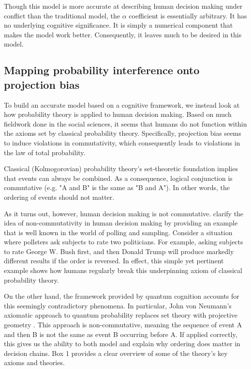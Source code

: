 \documentclass[12pt]{article}
\begin{document}
	Though this model is more accurate at describing human decision making under conflict than the traditional model, the $\alpha$ coefficient is essentially arbitrary. It has no underlying cognitive significance. It is simply a numerical component that makes the model work better. Consequently, it leaves much to be desired in this model. 
	
		\subsection{Mapping probability interference onto projection bias}
	To build an accurate model based on a cognitive framework, we instead look at how probability theory is applied to human decision making. Based on much fieldwork done in the social sciences, it seems that humans do not function within the axioms set by classical probability theory. Specifically, projection bias seems to induce violations in commutativity, which consequently leads to violations in the law of total probability. 
	
	Classical (Kolmogorovian) probability theory's set-theoretic foundation implies that events can always be combined. As a consequence, logical conjunction is commutative (e.g. "A and B" is the same as "B and A"). In other words, the ordering of events should not matter. 
	
	As it turns out, however, human decision making is not commutative. \cite{bruza_wang_busemeyer_2015} clarify the idea of non-commutativity in human decision making by providing an example that is well known in the world of polling and sampling. Consider a situation where pollsters ask subjects to rate two politicians.  For example, asking subjects to rate George W. Bush first, and then Donald Trump will produce markedly different results if the order is reversed. In effect, this simple yet pertinent example shows how humans regularly break this underpinning axiom of classical probability theory. 
	
	On the other hand, the framework provided by quantum cognition accounts for this seemingly contradictory phenomena. In particular, John von Neumann's axiomatic approach to quantum probability replaces set theory with projective geometry \citep{neumann_1932}. This approach is non-commutative, meaning the sequence of event A and then B is not the same as event B occurring before A. If applied correctly, this gives us the ability to both model and explain why ordering does matter in decision chains. Box 1 provides a clear overview of some of the theory's key axioms and theories.
\end{document}
